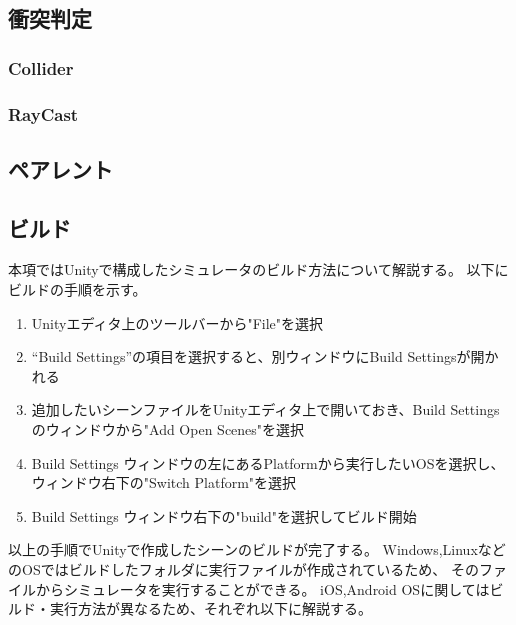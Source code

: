 \documentclass{ltjsreport}
\begin{document}
		\subsection{衝突判定}
			
			\subsubsection{Collider}
			\subsubsection{RayCast}
		\subsection{ペアレント}
		\subsection{ビルド}
			本項ではUnityで構成したシミュレータのビルド方法について解説する。
			以下にビルドの手順を示す。
			\begin{enumerate}
				\item Unityエディタ上のツールバーから"File"を選択
				\item ``Build Settings''の項目を選択すると、別ウィンドウにBuild Settingsが開かれる
				\item 追加したいシーンファイルをUnityエディタ上で開いておき、Build Settingsのウィンドウから"Add Open Scenes"を選択
				\item Build Settings ウィンドウの左にあるPlatformから実行したいOSを選択し、ウィンドウ右下の"Switch Platform"を選択
				\item Build Settings ウィンドウ右下の"build"を選択してビルド開始
			\end{enumerate}
			以上の手順でUnityで作成したシーンのビルドが完了する。
			Windows,LinuxなどのOSではビルドしたフォルダに実行ファイルが作成されているため、
			そのファイルからシミュレータを実行することができる。
			iOS,Android OSに関してはビルド・実行方法が異なるため、それぞれ以下に解説する。
\end{document}
